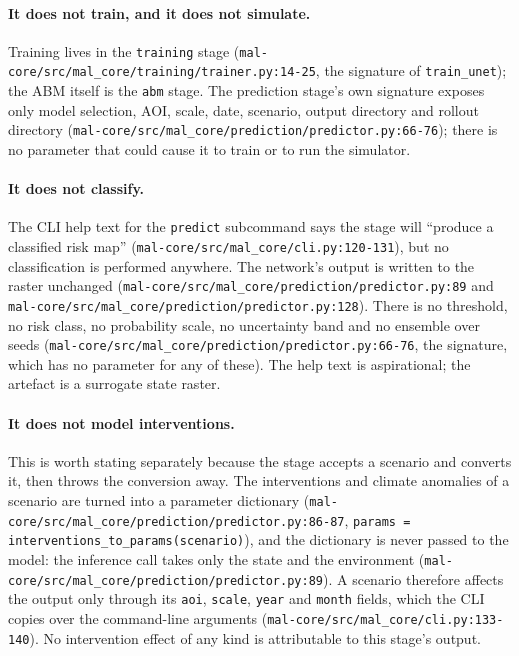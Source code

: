 \documentclass[11pt,a4paper]{article}
\newcommand{\code}[1]{\texttt{#1}}
\begin{document}
\paragraph{It does not train, and it does not simulate.}
Training lives in the \code{training} stage
(\code{mal-core/src/mal\_core/training/trainer.py:14-25}, the signature of
\code{train\_unet}); the ABM itself is the \code{abm} stage. The prediction
stage's own signature exposes only model selection, AOI, scale, date,
scenario, output directory and rollout directory
(\code{mal-core/src/mal\_core/prediction/predictor.py:66-76}); there is no
parameter that could cause it to train or to run the simulator.

\paragraph{It does not classify.}
The CLI help text for the \code{predict} subcommand says the stage will
``produce a classified risk map''
(\code{mal-core/src/mal\_core/cli.py:120-131}), but no classification is
performed anywhere. The network's output is written to the raster unchanged
(\code{mal-core/src/mal\_core/prediction/predictor.py:89} and
\code{mal-core/src/mal\_core/prediction/predictor.py:128}). There is no
threshold, no risk class, no probability scale, no uncertainty band and no
ensemble over seeds
(\code{mal-core/src/mal\_core/prediction/predictor.py:66-76}, the signature,
which has no parameter for any of these). The help text is aspirational; the
artefact is a surrogate state raster.

\paragraph{It does not model interventions.}
This is worth stating separately because the stage accepts a scenario and
converts it, then throws the conversion away. The interventions and climate
anomalies of a scenario are turned into a parameter dictionary
(\code{mal-core/src/mal\_core/prediction/predictor.py:86-87},
\code{params = interventions\_to\_params(scenario)}), and the dictionary is
never passed to the model: the inference call takes only the state and the
environment (\code{mal-core/src/mal\_core/prediction/predictor.py:89}). A
scenario therefore affects the output only through its \code{aoi},
\code{scale}, \code{year} and \code{month} fields, which the CLI copies over
the command-line arguments
(\code{mal-core/src/mal\_core/cli.py:133-140}). No intervention effect of any
kind is attributable to this stage's output.
\end{document}
